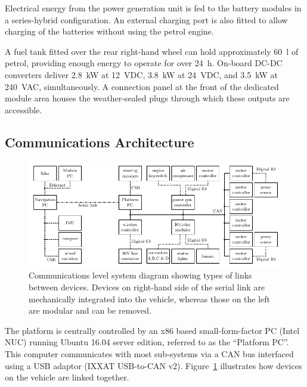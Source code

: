 \documentclass[preprint,authoryear,12pt]{elsarticle}
\begin{document}
        Electrical energy from the power generation unit is fed to the battery modules in a series-hybrid configuration.
        An external charging port is also fitted to allow charging of the batteries without using the petrol engine.

        A fuel tank fitted over the rear right-hand wheel can hold approximately \SI{60}{\litre} of petrol, providing enough energy to operate for over \SI{24}{\hour}.
        On-board DC-DC converters deliver \SI{2.8}{\kilo\watt} at \SI{12}{\volt}DC, \SI{3.8}{\kilo\watt} at \SI{24}{\volt}DC, and \SI{3.5}{\kilo\watt} at \SI{240}{\volt}AC, simultaneously.
        A connection panel at the front of the dedicated module area houses the weather-sealed plugs through which these outputs are accessible.


    \subsection{Communications Architecture}
    \label{sect:architecture}

        \begin{figure}[htb]
            \centering
            \includegraphics[width=\linewidth]{imgs/system_diagram/diagram_v5.pdf}
            \caption{
                Communications level system diagram showing types of links between devices.
                Devices on right-hand side of the serial link are mechanically integrated into the vehicle, whereas those on the left are modular and can be removed.
            }
            \label{fig:system_diagram}
        \end{figure}

        The platform is centrally controlled by an x86 based small-form-factor PC (Intel NUC) running Ubuntu 16.04 server edition, referred to as the ``Platform PC''.
        This computer communicates with most sub-systems via a CAN bus interfaced using a USB adaptor (IXXAT USB-to-CAN v2).
        Figure~\ref{fig:system_diagram} illustrates how devices on the vehicle are linked together.
\end{document}

